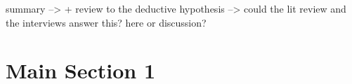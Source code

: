 

























summary
--> + review to the deductive hypothesis --> could the lit review and the interviews answer this? here or discussion?































\section{Main Section 1}

